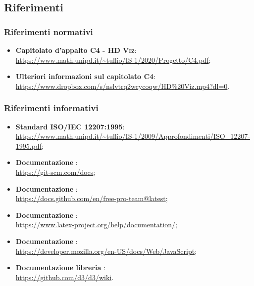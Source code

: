 \subsection{Riferimenti}
\subsubsection{Riferimenti normativi}
\begin{itemize}
    \item \textbf{Capitolato d'appalto \textsc{C4 - HD Viz}}: \\
    \url{https://www.math.unipd.it/~tullio/IS-1/2020/Progetto/C4.pdf};
    \item \textbf{Ulteriori informazioni sul capitolato C4}: \\
    \url{https://www.dropbox.com/s/nslvtrq2wcycoqw/HD\%20Viz.mp4?dl=0}.
\end{itemize}

\subsubsection{Riferimenti informativi}
\begin{itemize}
    \item \textbf{Standard ISO/IEC 12207:1995}: \\
    \url{https://www.math.unipd.it/~tullio/IS-1/2009/Approfondimenti/ISO_12207-1995.pdf};
    \item \textbf{Documentazione }: \\
    \url{https://git-scm.com/docs};
    \item \textbf{Documentazione }: \\
    \url{https://docs.github.com/en/free-pro-team@latest};
    \item \textbf{Documentazione \glossario{\LaTeX}}: \\
    \url{https://www.latex-project.org/help/documentation/};
    \item \textbf{Documentazione }: \\
    \url{https://developer.mozilla.org/en-US/docs/Web/JavaScript};
    \item \textbf{Documentazione libreria }: \\
    \url{https://github.com/d3/d3/wiki}.

\end{itemize}